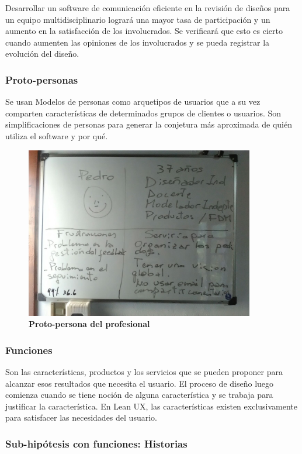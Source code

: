 Desarrollar un software de comunicación eficiente en la revisión de diseños para un equipo multidisciplinario
logrará una mayor tasa de participación y un aumento en la satisfacción de los involucrados.
Se verificará que esto es cierto cuando aumenten las opiniones de los involucrados y se pueda registrar la evolución del diseño.


\subsubsection{Proto-personas}

Se usan Modelos de personas como arquetipos de usuarios que a su vez comparten características de determinados grupos de clientes o usuarios.
Son simplificaciones de personas para generar la conjetura más aproximada de quién utiliza el software y por qué. 

\begin{figure}[h]
\includegraphics[width=10cm]{Img/UX/UX-proto.jpg}
\centering
\caption{\textbf{ \footnotesize{Proto-persona del profesional}}}
\end{figure}


\subsubsection{Funciones}
 Son las características, productos y los servicios que se pueden proponer para alcanzar esos resultados que necesita el usuario. El proceso de diseño luego comienza cuando se tiene noción de alguna característica y se trabaja para justificar la característica. En Lean UX, las características existen exclusivamente para satisfacer las necesidades del usuario.

\subsubsection{Sub-hipótesis con funciones: Historias}



